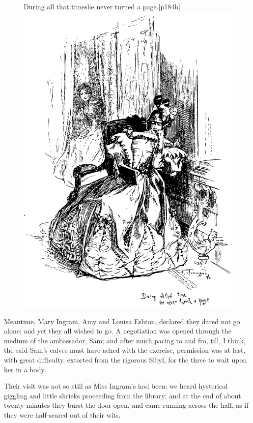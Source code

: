 \begin{figure}
	\begin{sidecaption}{During all that time\linebreak she never turned a page.}[p184b]
		\centering
		\includegraphics[width=\linewidth]{images/p184b.pdf}
	\end{sidecaption}
\end{figure}

Meantime, Mary Ingram, Amy and Louisa Eshton, declared they dared not go
alone; and yet they all wished to go. A negotiation was opened through
the medium of the ambassador, Sam; and after much pacing to and fro,
till, I think, the said Sam's calves must have ached with the exercise,
permission was at last, with great difficulty, extorted from the
rigorous Sibyl, for the three to wait upon her in a body.

Their visit was not so still as Miss Ingram's had been: we heard
hysterical giggling and little shrieks proceeding from the library; and
at the end of about twenty minutes they burst the door open, and came
running across the hall, as if they were half-scared out of their wits.


